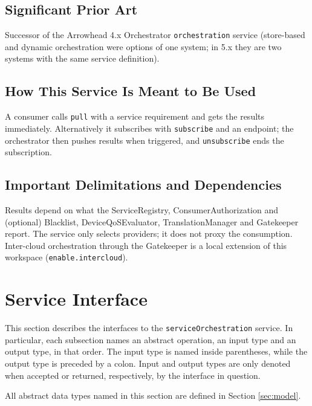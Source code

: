 \documentclass[a4paper]{arrowhead}
\begin{document}
\subsection{Significant Prior Art}

Successor of the Arrowhead 4.x Orchestrator \texttt{orchestration} service (store-based and dynamic orchestration were options of one system; in 5.x they are two systems with the same service definition).

\subsection{How This Service Is Meant to Be Used}

A consumer calls \texttt{pull} with a service requirement and gets the results immediately. Alternatively it subscribes with \texttt{subscribe} and an endpoint; the orchestrator then pushes results when triggered, and \texttt{unsubscribe} ends the subscription.

\subsection{Important Delimitations and Dependencies}
\label{sec:delimitations}

Results depend on what the ServiceRegistry, Consumer\allowbreak{}Authorization and (optional) Blacklist, Device\allowbreak{}Qo\allowbreak{}SEvaluator, Translation\allowbreak{}Manager and Gatekeeper report. The service only selects providers; it does not proxy the consumption. Inter-cloud orchestration through the Gatekeeper is a local extension of this workspace (\texttt{enable.\allowbreak{}intercloud}).

\newpage

\section{Service Interface}
\label{sec:operations}

This section describes the interfaces to the \texttt{service\allowbreak{}Orchestration} service.
In particular, each subsection names an abstract operation, an input type and an output type, in that order.
The input type is named inside parentheses, while the output type is preceded by a colon.
Input and output types are only denoted when accepted or returned, respectively, by the interface in question.

All abstract data types named in this section are defined in Section \ref{sec:model}.
\end{document}
